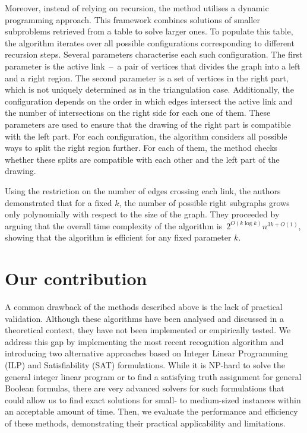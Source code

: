 Moreover, instead of relying on recursion, the method utilises a dynamic programming approach. This framework combines solutions of smaller subproblems retrieved from a table to solve larger ones. To populate this table, the algorithm iterates over all possible configurations corresponding to different recursion steps. Several parameters characterise each such configuration. The first parameter is the active link~--~a pair of vertices that divides the graph into a left and a right region. The second parameter is a set of vertices in the right part, which is not uniquely determined as in the triangulation case. Additionally, the configuration depends on the order in which edges intersect the active link and the number of intersections on the right side for each one of them. These parameters are used to ensure that the drawing of the right part is compatible with the left part. For each configuration, the algorithm considers all possible ways to split the right region further. For each of them, the method checks whether these splits are compatible with each other and the left part of the drawing.

Using the restriction on the number of edges crossing each link, the authors demonstrated that for a fixed \(k\), the number of possible right subgraphs grows only polynomially with respect to the size of the graph. They proceeded by arguing that the overall time complexity of the algorithm is~\(2^{O(k \log k)}n^{3k + O(1)}\), showing that the algorithm is efficient for any fixed parameter \(k\).


\section{Our contribution}

A common drawback of the methods described above is the lack of practical validation. Although these algorithms have been analysed and discussed in a theoretical context, they have not been implemented or empirically tested. We address this gap by implementing the most recent recognition algorithm and introducing two alternative approaches based on Integer Linear Programming (ILP) and Satisfiability (SAT) formulations. While it is NP-hard to solve the general integer linear program or to find a satisfying truth assignment for general Boolean formulas, there are very advanced solvers for such formulations that could allow us to find exact solutions for small- to medium-sized instances within an acceptable amount of time. Then, we evaluate the performance and efficiency of these methods, demonstrating their practical applicability and limitations.
